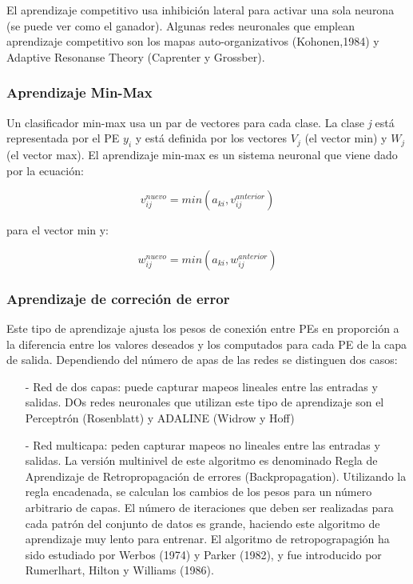 El aprendizaje competitivo usa inhibición lateral para activar una sola neurona
(se puede ver como el ganador). Algunas redes neuronales que emplean
aprendizaje competitivo son los mapas auto-organizativos (Kohonen,1984) y
Adaptive Resonanse Theory (Caprenter y Grossber).

\subsubsection{Aprendizaje Min-Max}

Un clasificador min-max usa un par de vectores para cada clase. La clase
\emph{j} está representada por el PE $y_i$ y está definida por los vectores
$V_j$ (el vector min) y $W_j$ (el vector max).  El aprendizaje min-max es un
sistema neuronal que viene dado por la ecuación:

$$ v_{ij}^{nuevo} = min(a_{ki},v_{ij}^{anterior}) $$

para el vector min y:

$$ w_{ij}^{nuevo} = min(a_{ki},w_{ij}^{anterior}) $$

\subsubsection{Aprendizaje de correción de error}

Este tipo de aprendizaje ajusta los pesos de conexión entre PEs en proporción a
la diferencia entre los valores deseados y los computados para cada PE de la
capa de salida. Dependiendo del número de apas de las redes se distinguen dos
casos:
\begin{itemize}
	\item[-] Red de dos capas: puede capturar mapeos lineales entre las entradas 
	y salidas. DOs redes neuronales que utilizan este tipo de aprendizaje son el 
	Perceptrón (Rosenblatt) y ADALINE (Widrow y Hoff)
	\item[-] Red multicapa: peden capturar mapeos no lineales entre las entradas 
	y salidas. La versión multinivel de este algoritmo es denominado Regla de 
	Aprendizaje de Retropropagación de errores (Backpropagation). Utilizando la 
	regla encadenada, se calculan los cambios de los pesos para un número arbitrario 
	de capas. El número de iteraciones que deben ser realizadas para cada patrón 
	del conjunto de datos es grande, haciendo este algoritmo de aprendizaje muy 
	lento para entrenar. El algoritmo de retropograpagión ha sido estudiado por 
	Werbos (1974) y Parker (1982), y fue introducido por Rumerlhart, Hilton y 
	Williams (1986).
\end{itemize}

